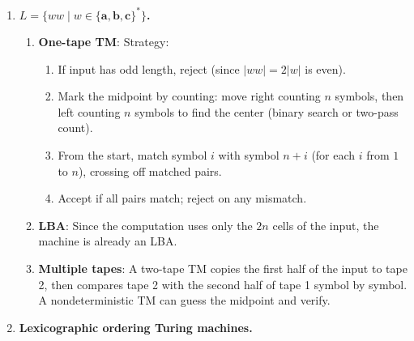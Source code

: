 \begin{enumerate}[{11.}1. ]
\begin{enumerate}
By designing $M$ to halt on all inputs and write $\pmb{Y}$/$\pmb{N}$ appropriately, all four acceptance modes agree.

\item \textbf{Is this always possible?}: Yes, for any Turing-acceptable language $L$. Proof: Given any TM $A$ accepting $L$, by the $L_1$/$L_2$/$L_3$ equivalence theorems (Exercise 11.19), there is a halting TM $A'$ accepting $L$ in any of the four modes. If we require all four modes to agree, we need $A$ to halt on \emph{all} inputs (not just those in $L$). This is possible iff $L$ is \emph{recursive} (decidable). For Turing-acceptable but not recursive languages, $L(M)=L$ but $M$ may not halt on all inputs, preventing $L_1(M)=L$. So the answer is: \textbf{yes if and only if $L$ is recursive}. For every recursive language, we can build $M$ with all four modes agreeing.
\end{enumerate}

\item \textbf{$L = \{ww \mid w\in\{\pmb{a},\pmb{b},\pmb{c}\}^*\}$.}

\begin{enumerate}
\item \textbf{One-tape TM}:
Strategy:
\begin{enumerate}[1.]
\item If input has odd length, reject (since $|ww|=2|w|$ is even).
\item Mark the midpoint by counting: move right counting $n$ symbols, then left counting $n$ symbols to find the center (binary search or two-pass count).
\item From the start, match symbol $i$ with symbol $n+i$ (for each $i$ from $1$ to $n$), crossing off matched pairs.
\item Accept if all pairs match; reject on any mismatch.
\end{enumerate}

\item \textbf{LBA}: Since the computation uses only the $2n$ cells of the input, the machine is already an LBA.

\item \textbf{Multiple tapes}: A two-tape TM copies the first half of the input to tape 2, then compares tape 2 with the second half of tape 1 symbol by symbol. A nondeterministic TM can guess the midpoint and verify.
\end{enumerate}

\item \textbf{Lexicographic ordering Turing machines.}


\end{enumerate}
